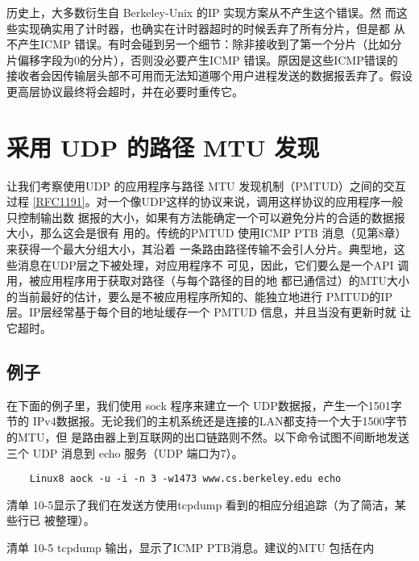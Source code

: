 \begin{tcolorbox}    
    历史上，大多数衍生自 Berkeley-Unix 的IP 实现方案从不产生这个错误。然
    而这些实现确实用了计时器，也确实在计时器超时的时候丢弃了所有分片，但是都
    从不产生ICMP 错误。有时会碰到另一个细节：除非接收到了第一个分片（比如分
    片偏移字段为0的分片），否则没必要产生ICMP 错误。原因是这些ICMP错误的
    接收者会因传输层头部不可用而无法知道哪个用户进程发送的数据报丢弃了。假设
    更高层协议最终将会超时，并在必要时重传它。
\end{tcolorbox}

\section{采用 UDP 的路径 MTU 发现}

让我们考察使用UDP 的应用程序与路径 MTU 发现机制（PMTUD）之间的交互过程
\href{https://www.rfc-editor.org/rfc/rfc1191}{[RFC1191]}。对一个像UDP这样的协议来说，调用这样协议的应用程序一般只控制输出数
据报的大小，如果有方法能确定一个可以避免分片的合适的数据报大小，那么这会是很有
用的。传统的PMTUD 使用ICMP PTB 消息（见第8章）来获得一个最大分组大小，其沿着
一条路由路径传输不会引人分片。典型地，这些消息在UDP层之下被处理，对应用程序不
可见，因此，它们要么是一个API 调用，被应用程序用于获取对路径（与每个路径的目的地
都已通信过）的MTU大小的当前最好的估计，要么是不被应用程序所知的、能独立地进行
PMTUD的IP层。IP层经常基于每个目的地址缓存一个 PMTUD 信息，并且当没有更新时就
让它超时。

\subsection{例子}
在下面的例子里，我们使用 sock 程序来建立一个 UDP数据报，产生一个1501字节的
IPv4数据报。无论我们的主机系统还是连接的LAN都支持一个大于1500字节的MTU，但
是路由器上到互联网的出口链路则不然。以下命令试图不间断地发送三个 UDP 消息到 echo
服务（UDP 端口为7）。

\begin{verbatim}
    Linux8 aock -u -i -n 3 -w1473 www.cs.berkeley.edu echo
\end{verbatim}

清单 10-5显示了我们在发送方使用tcpdump 看到的相应分组追踪（为了简洁，某些行已
被整理）。

清单 10-5 tcpdump 输出，显示了ICMP PTB消息。建议的MTU 包括在内

